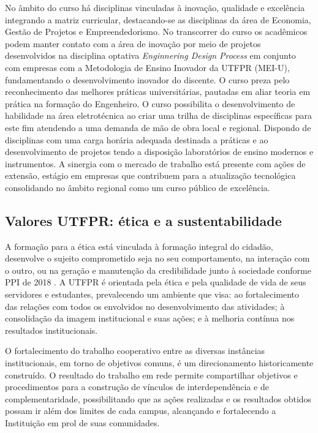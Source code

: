 
No âmbito do curso há disciplinas vinculadas à inovação, qualidade e excelência integrando a matriz curricular, destacando-se as disciplinas da área de Economia, Gestão de Projetos e Empreendedorismo. No transcorrer do curso os acadêmicos podem manter contato com a área de inovação por meio de projetos desenvolvidos na disciplina optativa \textit{Enginnering Design Process} em conjunto com empresas com a Metodologia de Ensino Inovador da UTFPR (MEI-U), fundamentando o desenvolvimento inovador do discente. O curso preza pelo reconhecimento das melhores práticas universitárias, pautadas em aliar teoria em prática na formação do Engenheiro.  O curso possibilita o desenvolvimento de habilidade na área eletrotécnica ao criar uma trilha de disciplinas específicas para este fim atendendo a uma demanda de mão de obra local e regional. Dispondo de disciplinas com uma carga horária adequada destinada a práticas e ao desenvolvimento de projetos tendo a disposição laboratórios de ensino modernos e instrumentos. A sinergia com o mercado de trabalho está presente com ações de extensão, estágio em empresas que contribuem para a atualização tecnológica consolidando no âmbito regional como um curso público de excelência.


\subsection{Valores UTFPR: ética e a sustentabilidade}

A formação para a ética está vinculada à formação integral do cidadão, desenvolve o sujeito comprometido seja no seu comportamento, na interação com o outro, ou na geração e manutenção da credibilidade junto à sociedade conforme PPI de 2018 \cite{ppiutfpr}.  A UTFPR é orientada pela ética e pela qualidade de vida de seus servidores e estudantes, prevalecendo um ambiente que visa: ao fortalecimento das relações com todos os envolvidos no desenvolvimento das atividades; à consolidação da imagem institucional e suas ações; e à melhoria contínua nos resultados institucionais.

O fortalecimento do trabalho cooperativo entre as diversas instâncias institucionais, em torno de objetivos comuns, é um direcionamento historicamente construído. O resultado do trabalho em rede permite compartilhar objetivos e procedimentos para a construção de vínculos de interdependência e de complementaridade, possibilitando que as ações realizadas e os resultados obtidos possam ir além dos limites de cada campus, alcançando e fortalecendo a Instituição em prol de suas comunidades.

